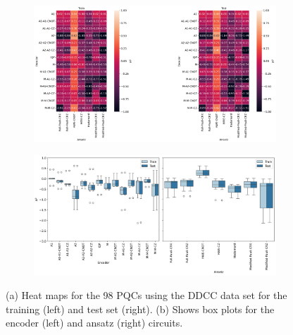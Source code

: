 \documentclass[journal=jacsat,manuscript=article]{achemso}
\begin{document}
\begin{figure}[H]
	\centering	
	\begin{subfigure}[b]{0.49\textwidth}
		\centering
		\includegraphics[width=\linewidth]{../images/DDCC/DDCC_heatplots}
		\caption{}
		\label{fig:ddccheatplots}
	\end{subfigure}
	\hfill	
	\begin{subfigure}[b]{0.49\textwidth}
		\centering
		\includegraphics[width=\linewidth]{../images/DDCC/DDCC_boxplots}
		\caption{}
		\label{fig:ddccboxplots}
	\end{subfigure}
	\caption{(a) Heat maps for the 98 PQCs using the DDCC data set for the training (left) and test set (right). (b) Shows box plots for the encoder (left) and ansatz (right) circuits.}
	\label{fig:ddcc_all_analysis}	
\end{figure}
\end{document}
